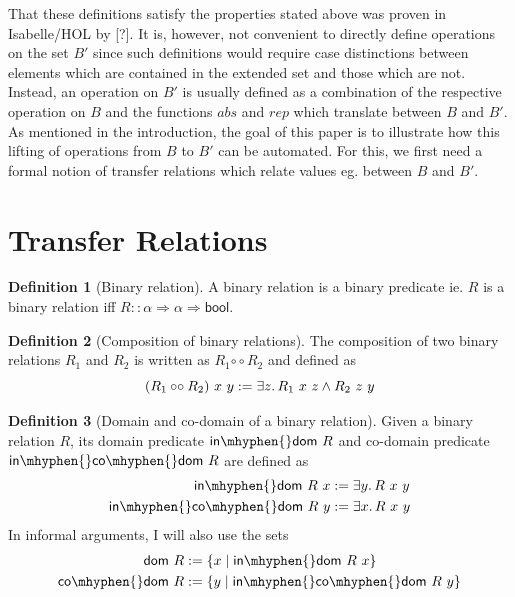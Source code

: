 \documentclass[]{article}
\theoremstyle{definition}
\newtheorem{definition}{Definition}[section]
\newcommand{\relcomp}{\mathbin{\circ\circ}}
\newcommand{\indom}{\mathsf{in\mhyphen{}dom}}
\newcommand{\incodom}{\mathsf{in\mhyphen{}co\mhyphen{}dom}}
\newcommand{\dom}{\mathsf{dom}}
\newcommand{\codom}{\mathsf{co\mhyphen{}dom}}
\begin{document}
That these definitions satisfy the properties stated above was proven in Isabelle/HOL by [?]. It is, however, not convenient to directly define operations on the set \(B'\) since such definitions would require case distinctions between elements which are contained in the extended set and those which are not. Instead, an operation on \(B'\) is usually defined as a combination of the respective operation on \(B\) and the functions \(abs\) and \(rep\) which translate between \(B\) and \(B'\). As mentioned in the introduction, the goal of this paper is to illustrate how this lifting of operations from \(B\) to \(B'\) can be automated. For this, we first need a formal notion of transfer relations which relate values eg. between \(B\) and \(B'\).

\section{Transfer Relations}
\begin{definition}[Binary relation]
	A binary relation is a binary predicate ie. \(R\) is a binary relation iff \(R :: \alpha \Rightarrow \alpha \Rightarrow \mathsf{bool}\).
\end{definition}

\begin{definition}[Composition of binary relations]
	The composition of two binary relations \(R_1\) and \(R_2\) is written as \(R_1 \relcomp R_2\) and defined as
	\begin{equation}
		(R_1 \relcomp R_2)\ x\ y := \exists z\ldotp R_1\ x\ z \land R_2\ z\ y
	\end{equation}
\end{definition}

\begin{definition}[Domain and co-domain of a binary relation]
	Given a binary relation \(R\), its domain predicate \(\indom\ R\) and co-domain predicate \(\incodom\ R\) are defined as
	\begin{align}
		\indom\ R\ x &:= \exists y\ldotp R\ x\ y \label{in-dom-def} \\
		\incodom\ R\ y &:= \exists x\ldotp R\ x\ y \label{in-co-dom-def}
	\end{align}
	In informal arguments, I will also use the sets
	\begin{align}
		\dom\ R &:= \{x \mid \indom\ R\ x\} \\
		\codom\ R &:= \{y \mid \incodom\ R\ y\}
	\end{align}
\end{definition}
\end{document}

